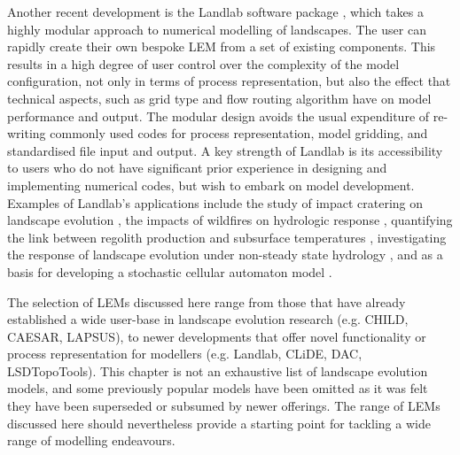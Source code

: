 Another recent development is the Landlab software package \citep{hobley2017creative}, which takes a highly modular approach to numerical modelling of landscapes. The user can rapidly create their own bespoke LEM from a set of existing components. This results in a high degree of user control over the complexity of the model configuration, not only in terms of process representation, but also the effect that technical aspects, such as grid type and flow routing algorithm have on model performance and output. The modular design avoids the usual expenditure of re-writing commonly used codes for process representation, model gridding, and standardised file input and output. A key strength of Landlab is its accessibility to users who do not have significant prior experience in designing and implementing numerical codes, but wish to embark on model development. Examples of Landlab's applications include the study of impact cratering on landscape evolution \citep{hobley2013modeling}, the impacts of wildfires on hydrologic response \citep{adams2017landlab}, quantifying the link between regolith production and subsurface temperatures \citep{barnhart2014chilly}, investigating the response of landscape evolution under non-steady state hydrology \citep{adams2017landlab}, and as a basis for developing a stochastic cellular automaton model \citep{Tucker2015}.

The selection of LEMs discussed here range from those that have already established a wide user-base in landscape evolution research (e.g. CHILD, CAESAR, LAPSUS), to newer developments that offer novel functionality or process representation for modellers (e.g. Landlab, CLiDE, DAC, LSDTopoTools). This chapter is not an exhaustive list of landscape evolution models, and some previously popular models have been omitted as it was felt they have been superseded or subsumed by newer offerings. The range of LEMs discussed here should nevertheless provide a starting point for tackling a wide range of modelling endeavours.

